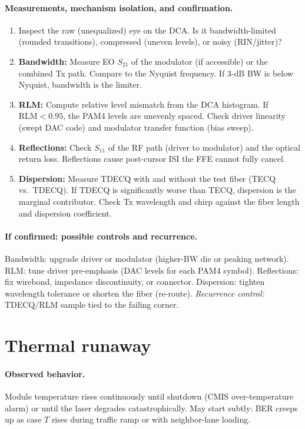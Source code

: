 \paragraph{Measurements, mechanism isolation, and confirmation.}
\begin{enumerate}
\item Inspect the raw (unequalized) eye on the DCA. Is it bandwidth-limited
      (rounded transitions), compressed (uneven levels), or noisy (RIN/jitter)?
\item \textbf{Bandwidth:} Measure EO $S_{21}$ of the modulator (if accessible) or
      the combined Tx path. Compare to the Nyquist frequency. If 3-dB BW is below
      Nyquist, bandwidth is the limiter.
\item \textbf{RLM:} Compute relative level mismatch from the DCA histogram. If
      $\mathrm{RLM} < 0.95$, the PAM4 levels are unevenly spaced. Check driver
      linearity (swept DAC code) and modulator transfer function (bias sweep).
\item \textbf{Reflections:} Check $S_{11}$ of the RF path (driver to modulator)
      and the optical return loss. Reflections cause post-cursor ISI the FFE
      cannot fully cancel.
\item \textbf{Dispersion:} Measure TDECQ with and without the test fiber (TECQ vs.\
      TDECQ). If TDECQ is significantly worse than TECQ, dispersion is the marginal
      contributor. Check Tx wavelength and chirp against the fiber length and
      dispersion coefficient.
\end{enumerate}

\paragraph{If confirmed: possible controls and recurrence.}
Bandwidth: upgrade driver or modulator (higher-BW die or peaking network). RLM:
tune driver pre-emphasis (DAC levels for each PAM4 symbol). Reflections: fix
wirebond, impedance discontinuity, or connector. Dispersion: tighten wavelength
tolerance or shorten the fiber (re-route).
\emph{Recurrence control:} TDECQ/RLM sample tied to the failing corner.

\section{Thermal runaway}
\label{sec:fm-thermal-runaway}

\paragraph{Observed behavior.}
Module temperature rises continuously until shutdown (CMIS over-temperature alarm)
or until the laser degrades catastrophically. May start subtly: BER creeps up as
case $T$ rises during traffic ramp or with neighbor-lane loading.

